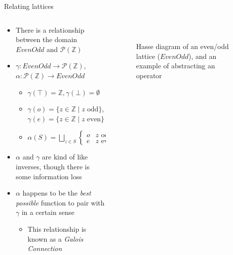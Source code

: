 \documentclass[aspectratio=169]{beamer}
\begin{document}
\begin{frame}{Relating lattices}
  \begin{columns}
    \begin{column}{0.6\textwidth}
      \vspace*{-.75em}
    \begin{itemize}
    \item There is a relationship between the domain $EvenOdd$ and
      $\mathcal{P}(\mathbb{Z})$
    \item $\gamma : EvenOdd \to \mathcal{P}(\mathbb{Z})$,
      $\alpha : \mathcal{P}(\mathbb{Z}) \to EvenOdd$
      \begin{itemize}
      \item<2-> $\gamma(\top) = \mathbb{Z}, \gamma(\bot) = \emptyset$
      \item<2->
        $\gamma(o) = \{z \in \mathbb{Z} \mid z \text{ odd} \}$,
        $\gamma(e) = \{z \in \mathbb{Z} \mid z \text{ even} \}$
      \item<3-> $\alpha(S) = \bigsqcup\limits_{z \in S}
        \begin{cases}
          o & z \text{ odd}\\
          e & z \text{ even}
        \end{cases}
        $
      \end{itemize}
    \item<5-> $\alpha$ and $\gamma$ are kind of like inverses, though
      there is some information loss
    \item<6-> $\alpha$ happens to be the \emph{best possible} function to pair
      with $\gamma$ in a certain sense
      \begin{itemize}
      \item<7-> This relationship is known as a \emph{Galois Connection}
      \end{itemize}
    \end{itemize}
  \end{column}
  \begin{column}{0.4\textwidth}
    \begin{figure}
      \centering
      \\[1em]

      \caption{Hasse diagram of an even/odd lattice ($EvenOdd$), and
        an example of abstracting an operator}
    \end{figure}
  \end{column}
  \end{columns}
\end{frame}
\end{document}

